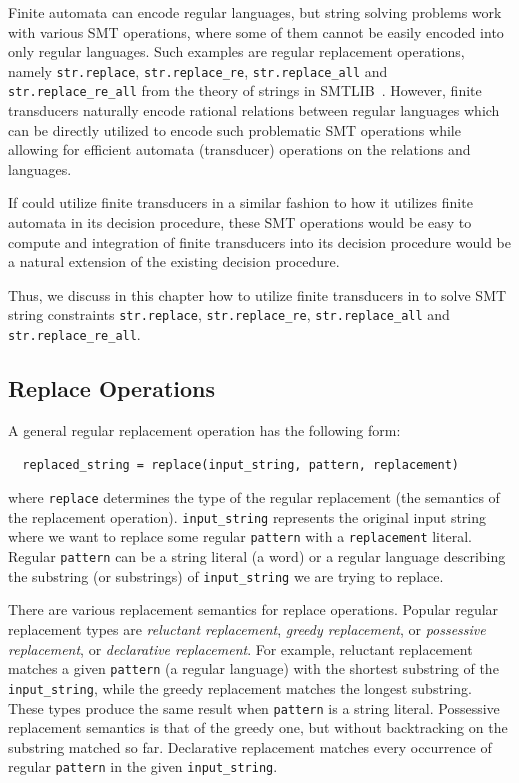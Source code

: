 Finite automata can encode regular languages, but string solving problems work with various SMT operations, where some of them cannot be easily encoded into only regular languages.
Such examples are regular replacement operations, namely \texttt{str.replace}, \texttt{str.replace\_re}, \texttt{str.replace\_all} and \texttt{str.replace\_re\_all} from the theory of strings in SMTLIB~\cite{smtlib_theory_strings}.
However, finite transducers naturally encode rational relations between regular languages which can be directly utilized to encode such problematic SMT operations while allowing for efficient automata (transducer) operations on the relations and languages.

If \noodler could utilize finite transducers in a similar fashion to how it utilizes finite automata in its decision procedure, these SMT operations would be easy to compute and integration of finite transducers into its decision procedure would be a natural extension of the existing decision procedure.

Thus, we discuss in this chapter how to utilize finite transducers in \noodler to solve SMT string constraints \texttt{str.replace}, \texttt{str.replace\_re}, \texttt{str.replace\_all} and \texttt{str.replace\_re\_all}.

\subsection{Replace Operations}
A general regular replacement operation has the following form:
\begin{center}
\begin{verbatim}
  replaced_string = replace(input_string, pattern, replacement)
\end{verbatim}
\end{center}
where \texttt{replace} determines the type of the regular replacement (the semantics of the replacement operation).
\texttt{input\_string} represents the original input string where we want to replace some regular \texttt{pattern} with a \texttt{replacement} literal.
Regular \texttt{pattern} can be a string literal (a word) or a regular language describing the substring (or substrings) of \texttt{input\_string} we are trying to replace.

There are various replacement semantics for replace operations. Popular regular replacement types are \emph{reluctant replacement}, \emph{greedy replacement}, or \emph{possessive replacement}, or \emph{declarative replacement}.
For example, reluctant replacement matches a given \texttt{pattern} (a regular language) with the shortest substring of the \texttt{input\_string}, while the greedy replacement matches the longest substring. These types produce the same result when \texttt{pattern} is a string literal.
Possessive replacement semantics is that of the greedy one, but without backtracking on the substring matched so far.
Declarative replacement matches every occurrence of regular \texttt{pattern} in the given \texttt{input\_string}.

